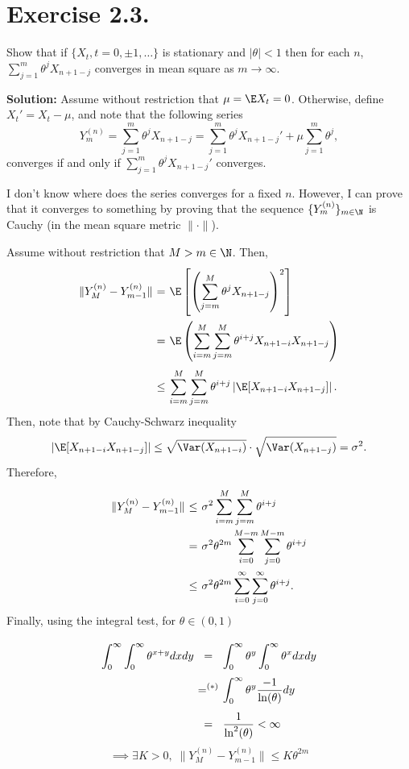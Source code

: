 \section*{Exercise 2.3.}

Show that if $\{X_t, t= 0,\pm 1,\ldots\}$ is stationary and $|\theta|<1$ then for each $n$, $\sum_{j = 1}^{m} \theta^j X_{n+1-j}$ converges in mean square as $m \to \infty$.

\textbf{Solution:}
Assume without restriction that $\mu = \E X_t = 0$. Otherwise, define $X_t' = X_t- \mu$, and note that the following series
\[ Y_m^{(n)} = \sum_{j = 1}^{m} \theta^j X_{n+1-j} = \sum_{j = 1}^{m} \theta^j X_{n+1-j}' + \mu \sum_{j = 1}^{m} \theta^j , \]
converges if and only if $\sum_{j = 1}^{m} \theta^j X_{n+1-j}'$ converges.

I don't know where does the series converges for a fixed $n$. However, I can prove that it converges to something by proving that the sequence $\{Y_m^{(n)}\}_{m\in \N}$ is Cauchy (in the mean square metric $\|\cdot\|$).

Assume without restriction that $M > m \in \N$. Then,
\[ \everymath{\displaystyle}
\arraycolsep=1.8pt\def\arraystretch{3}
\begin{array}{rcl}
    \|Y_{M}^{(n)} - Y_{m-1}^{(n)}\| & = & \E\left[ \left( \sum_{j = m}^{M} \theta^j X_{n+1-j} \right)^2 \right]\\
    & = & \E\left(  \sum_{i = m}^{M} \sum_{j = m}^{M} \theta^{i+j} X_{n+1-i} X_{n+1-j}  \right)\\
    & \leq & \sum_{i = m}^{M} \sum_{j = m}^{M} \theta^{i+j} \left| \E[X_{n+1-i} X_{n+1-j}] \right|.
\end{array} \]
Then, note that by Cauchy-Schwarz inequality
\[ \left| \E[X_{n+1-i} X_{n+1-j}] \right| \leq \sqrt{\Var(X_{n+1-i})}\cdot \sqrt{\Var(X_{n+1-j})} = \sigma^2. \]
Therefore,
\[ \everymath{\displaystyle}
\arraycolsep=1.8pt\def\arraystretch{2.5}
\begin{array}{rcl}
    \|Y_{M}^{(n)} - Y_{m-1}^{(n)}\| & \leq & \sigma^2 \sum_{i = m}^{M} \sum_{j = m}^{M}\theta^{i+j}\\
    & = & \sigma^2 \theta^{2m}\sum_{i = 0}^{M-m} \sum_{j = 0}^{M-m} \theta^{i+j}\\
    & \leq & \sigma^2 \theta^{2m} \sum_{i = 0}^{\infty} \sum_{j = 0}^{\infty} \theta^{i+j}.
\end{array}\]
Finally, using the integral test, for $\theta \in (0,1)$
\[ \everymath{\displaystyle}
\arraycolsep=1.8pt\def\arraystretch{2.5}
\begin{array}{rcl}
    \int_{0}^{\infty} \int_{0}^{\infty} \theta^{x+y} dx dy & = & \int_{0}^{\infty} \theta^{y} \int_{0}^{\infty} \theta^{x} dx dy\\
    & =^{(*)} & \int_{0}^{\infty} \theta^{y} \frac{-1}{\ln(\theta)} dy\\
    & = & \frac{1}{\ln^2(\theta)} < \infty
\end{array} \]
\[ \implies \exists K > 0,\;  \|Y_{M}^{(n)} - Y_{m-1}^{(n)}\| \leq K \theta^{2m} \]

